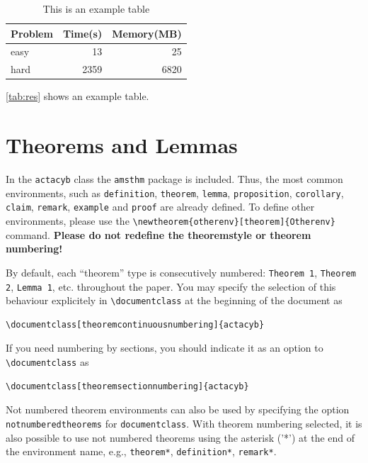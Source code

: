 \documentclass[withtitlethanks]{actacyb}
\begin{document}
\begin{table}[!ht]
\caption{This is an example table\label{tab:res}}
\begin{center}
\begin{tabular}{l|rr}
Problem & Time(s) & Memory(MB) \\ \hline
easy    & 13   & 25   \\
hard    & 2359 & 6820 \\
\end{tabular}
\end{center}
\end{table}
\autoref{tab:res} shows an example table.


\section{Theorems and Lemmas}\label{sec:theorems}

In the \verb|actacyb| class the \verb|amsthm| package is included.
Thus, the most common environments, such as \verb|definition|, \verb|theorem|, \verb|lemma|,
\verb|proposition|, \verb|corollary|, \verb|claim|, \verb|remark|, \verb|example| and \verb|proof| are already defined.
To define other environments, please use the \verb|\newtheorem{otherenv}[theorem]{Otherenv}|  
command.
{\bf Please do not redefine the theoremstyle or theorem numbering!}

By default, each ``theorem'' type is consecutively numbered:
\texttt{Theorem 1}, \texttt{Theorem 2}, \texttt{Lemma 1}, etc. throughout the paper.
You may specify the selection of this behaviour explicitely in \verb|\documentclass| at the beginning of the document as

\begin{verbatim}
\documentclass[theoremcontinuousnumbering]{actacyb}
\end{verbatim}

If you need numbering by sections, you should indicate it as an option to
\verb|\documentclass| as

\begin{verbatim}
\documentclass[theoremsectionnumbering]{actacyb}
\end{verbatim}

Not numbered theorem environments can also be used by specifying the option \verb|notnumberedtheorems| for \verb|documentclass|. With theorem numbering selected, it is also possible to use not numbered theorems using the asterisk ('*') at the end of the environment name, e.g., \verb|theorem*|, \verb|definition*|, \verb|remark*|.
\end{document}
